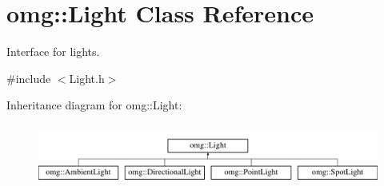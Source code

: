 \hypertarget{classomg_1_1_light}{}\section{omg\+::Light Class Reference}
\label{classomg_1_1_light}


Interface for lights.  




{\ttfamily \#include $<$Light.\+h$>$}

Inheritance diagram for omg\+::Light\+:\begin{figure}[H]
\begin{center}
\leavevmode
\includegraphics[height=2.000000cm]{classomg_1_1_light}
\end{center}
\end{figure}
